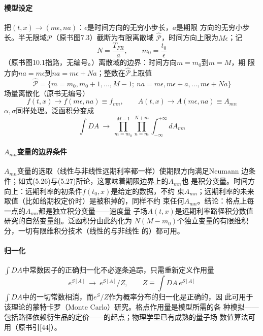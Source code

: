 \paragraph{模型设定}
把$(t,x)\to(m\epsilon,na)$：$\epsilon$是时间方向的无穷小步长，$a$是期限
方向的无穷小步长。半无限域$\mathcal{P}$（原书图7.3）截断为有限离散域
$\hat{\mathcal{P}}$，时间方向上限为$M\epsilon$；记
\begin{equation*}
N=\frac{T_{FR}}{a},\qquad m_{0}=\frac{t_{0}}{\epsilon}
\end{equation*}
（原书图10.1指路，无编号。）离散域的边界：时间方向$m=m_{0}$到$m=M$，期
限方向$na=m\epsilon$到$na=m\epsilon+Na$；整数在$\hat{\mathcal{P}}$上取值
\begin{equation*}
\hat{\mathcal{P}}=\{m=m_{0},m_{0}+1,\ldots,M-1;\ na=m\epsilon,
m\epsilon+a,\ldots,m\epsilon+Na\}
\end{equation*}
场量离散化（原书无编号）
\begin{equation*}
f(t,x)\to f(m\epsilon,na)\equiv f_{mn},\qquad
A(t,x)\to A(m\epsilon,na)\equiv A_{mn}
\end{equation*}
$\alpha,\sigma$同样处理。泛函积分变成
\begin{equation*}
\int DA\ \longrightarrow\ \prod_{m=m_{0}}^{M-1}\prod_{n=m}^{N+m}
\int_{-\infty}^{+\infty}dA_{mn}
\tag{7.89}
\end{equation*}

\paragraph{$A_{mn}$变量的边界条件}
$A_{mn}$变量的选取（线性与非线性远期利率都一样）使期限方向满足Neumann
边条件；如式(5.26)与(5.27)所论，这意味着期限边界上的$A_{mn}$\textbf{也}
是积分变量。时间方向上：远期利率的初条件$f(t_{0},x)$是给定的数据，不约
束$A_{mn}$；远期利率的未来取值（比如给期权定价时）是被积掉的，同样不约
束任何$A_{mn}$。结论：格点上每一点的$A_{mn}$都是独立积分变量——速度量
子场$A(t,x)$是远期利率路径积分数值研究的自然变量组。泛函积分由此约化为
$N(M-m_{0})$个独立变量的有限维积分，一切有限维积分技术（线性的与非线性
的）都可用。

\paragraph{归一化}
$\int DA$中常数因子的正确归一化不必逐条追踪，只需重新定义作用量
\begin{equation*}
e^{S[A]}\ \longrightarrow\ e^{S[A]}/Z,\qquad
Z\equiv\int DA\,e^{S[A]}
\tag{7.90}
\end{equation*}
$\int DA$中的一切常数相消，而$e^{S}/Z$作为概率分布的归一化是正确的，因
此可用于该理论的蒙特卡罗（Monte Carlo）研究。格点作用量是模型所需的各
种模拟——包括路径依赖衍生品的定价——的起点；物理学里已有成熟的量子场
数值算法可用（原书引[44]）。

